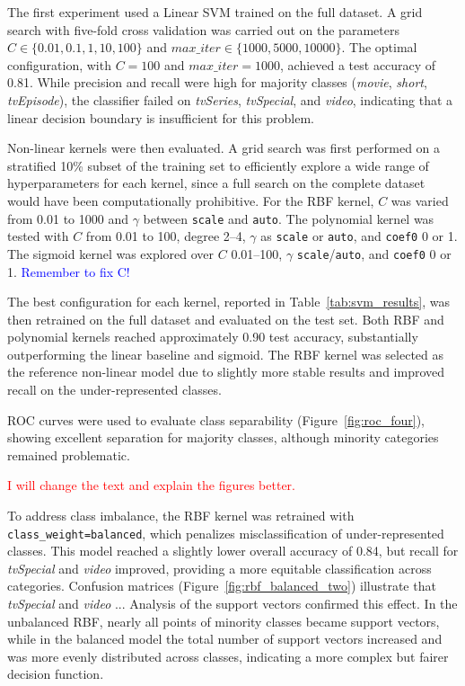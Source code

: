 The first experiment used a Linear SVM trained on the full dataset.  
A grid search with five-fold cross validation was carried out on the parameters 
$C \in \{0.01, 0.1, 1, 10, 100\}$ and $max\_iter \in \{1000, 5000, 10000\}$. 
The optimal configuration, with $C=100$ and $max\_iter=1000$, achieved a test accuracy of 0.81. 
While precision and recall were high for majority classes (\textit{movie}, \textit{short}, \textit{tvEpisode}), 
the classifier failed on \textit{tvSeries}, \textit{tvSpecial}, and \textit{video}, 
indicating that a linear decision boundary is insufficient for this problem.  

Non-linear kernels were then evaluated. 
A grid search was first performed on a stratified 10\% subset of the training set to efficiently explore a wide range of hyperparameters for each kernel, 
since a full search on the complete dataset would have been computationally prohibitive. 
For the RBF kernel, $C$ was varied from 0.01 to 1000 and $\gamma$ between \texttt{scale} and \texttt{auto}. 
The polynomial kernel was tested with $C$ from 0.01 to 100, degree 2--4, $\gamma$ as \texttt{scale} or \texttt{auto}, and \texttt{coef0} 0 or 1. 
The sigmoid kernel was explored over $C$ 0.01--100, $\gamma$ \texttt{scale}/\texttt{auto}, and \texttt{coef0} 0 or 1. 
\textcolor{blue}{Remember to fix C!}

The best configuration for each kernel, reported in Table~\ref{tab:svm_results}, was then retrained on the full dataset and evaluated on the test set. 
Both RBF and polynomial kernels reached approximately 0.90 test accuracy, substantially outperforming the linear baseline and sigmoid. 
The RBF kernel was selected as the reference non-linear model due to slightly more stable results and improved recall on the under-represented classes.


ROC curves were used to evaluate class separability (Figure~\ref{fig:roc_four}),
showing excellent separation for majority classes, although minority categories remained problematic. 

\textcolor{red}{I will change the text and explain the figures better.}

To address class imbalance, the RBF kernel was retrained with \texttt{class\_weight=balanced}, 
which penalizes misclassification of under-represented classes. 
This model reached a slightly lower overall accuracy of 0.84, 
but recall for \textit{tvSpecial} and \textit{video} improved, providing a more equitable classification across categories.  
Confusion matrices (Figure~\ref{fig:rbf_balanced_two}) 
illustrate that \textit{tvSpecial} and \textit{video} ...  
Analysis of the support vectors confirmed this effect. 
In the unbalanced RBF, nearly all points of minority classes became support vectors, 
while in the balanced model the total number of support vectors increased and was more evenly distributed across classes, 
indicating a more complex but fairer decision function. 


